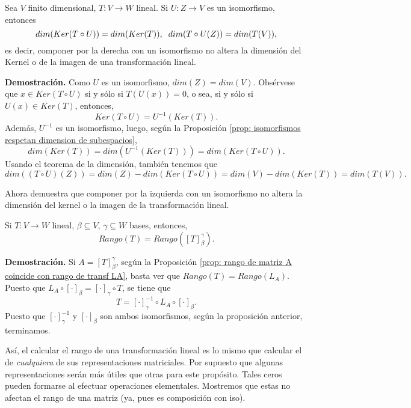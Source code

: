 \begin{prop}
Sea $V$ finito dimensional, $T: V \longrightarrow W$ lineal. 
Si $U: Z \longrightarrow V$ es un isomorfismo, entonces
\[
dim(Ker(T \circ U)) = dim(Ker(T)), 
\hspace{0.2cm} dim(T\circ U (Z)) = dim(T (V)),
\]
es decir, componer por la derecha con un isomorfismo no altera
la dimensión del Kernel o de la imagen de una transformación lineal.
\end{prop}
\noindent
\textbf{Demostración.}
Como $U$ es un isomorfismo, $dim(Z) = dim(V)$.
Obsérvese que $x \in Ker(T \circ U)$ si y sólo si 
$T(U(x)) = 0$, o sea, si y sólo si $U(x) \in Ker(T)$, entonces,
\[
Ker(T \circ U) = U^{-1}(Ker(T)).
\]
Además, $U^{-1}$ es un isomorfismo, luego, según
la Proposición \ref{prop: isomorfismos respetan dimension de subespacios},
\[
dim(Ker(T)) = dim(U^{-1}(Ker(T))) = dim(Ker(T \circ U)).
\]
Usando el teorema de la dimensión, también tenemos que
\[
dim((T \circ U)(Z)) = dim(Z) - dim(Ker(T \circ U))
= dim(V) - dim(Ker(T)) = dim(T(V)).
\]
\QEDB
\vspace{0.2cm}

 Ahora demuestra que componer por la izquierda
con un isomorfismo no altera la dimensión del kernel o la imagen
de la transformación lineal.


\begin{prop}
Si $T: V \longrightarrow W$ lineal, $\beta \subseteq V$,
$\gamma \subseteq W$ bases, entonces,
\begin{equation}
	Rango(T) = Rango([T]_{\beta}^{\gamma}).
\end{equation}
\end{prop}
\noindent
\textbf{Demostración.}
Si $A = [T]_{\beta}^{\gamma}$,
según la Proposición 
\ref{prop: rango de matriz A coincide con rango de transf LA},
basta ver que $Rango(T) = Rango(L_{A})$.
Puesto que $L_{A} \circ [\cdot]_{\beta} = [\cdot]_{\gamma} \circ T$,
se tiene que 
\[
T = [\cdot]_{\gamma}^{-1} \circ L_{A} \circ [\cdot]_{\beta}.
\]
Puesto que $[\cdot]_{\gamma}^{-1}$ y $[\cdot]_{\beta}$ son ambos
isomorfismos, según la proposición anterior, terminamos.
\QEDB
\vspace{0.2cm}

Así, el calcular el rango de una transformación lineal es lo 
mismo que calcular el de \textit{cualquiera} de sus representaciones
matriciales. Por supuesto que algunas representaciones serán más 
útiles que otras para este propósito. 
Tales ceros pueden formarse al efectuar operaciones elementales.
Mostremos que estas no afectan el rango de una matriz (ya, pues es 
composición con iso).